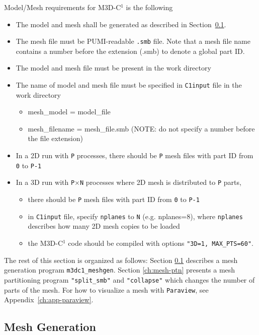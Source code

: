 Model/Mesh requirements for M3D-C$^{1}$ is the following
\begin{itemize}
\item	The model and mesh shall be generated as described in Section~\ref{ch:mesh-gen}.
\item	The mesh file must be PUMI-readable \texttt{.smb} file. Note that a mesh file name contains a number before the extension (.smb) to denote a global part ID.
\item	The model and mesh file must be present in the work directory
\item	The name of model and mesh file must be specified in \texttt{C1input} file in the work directory
\begin{itemize}
\item	mesh\_model = model\_file
\item	mesh\_filename = mesh\_file.smb (NOTE: do not specify a number before the file extension)
\end{itemize}
\item In a 2D run with \texttt{P} processes, there should be \texttt{P} mesh files with part ID from \texttt{0} to \texttt{P-1}
\item	In a 3D run with \texttt{P$\times$N} processes where 2D mesh is distributed to \texttt{P} parts, 
\begin{itemize}
\item	there should be \texttt{P} mesh files with part ID from \texttt{0} to \texttt{P-1}
\item	in \texttt{C1input} file, specify \texttt{nplanes} to \texttt{N} (e.g. nplanes=8), where \texttt{nplanes} describes how many 2D mesh copies to be loaded
\item	the M3D-C$^{1}$ code should be compiled with options \texttt{"3D=1, MAX\_PTS=60"}.
\end{itemize}
\end{itemize}

The rest of this section is organized as follows: Section \ref{ch:mesh-gen} describes a mesh generation program \texttt{m3dc1\_meshgen}. Section \ref{ch:mesh-ptn} presents a mesh partitioning program \texttt{"split\_smb"} and \texttt{"collapse"} which changes the number of parts of the mesh. For how to visualize a mesh with \texttt{Paraview}, see Appendix~\ref{ch:app-paraview}.

\subsection{Mesh Generation}
\label{ch:mesh-gen}

